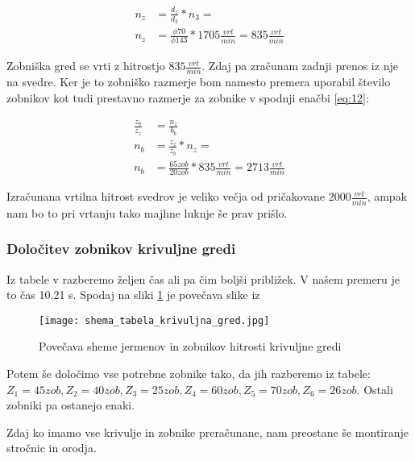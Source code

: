 \begin{equation}
    \label{eq:11}
    \begin{split}
        n_z &= \frac{d_z}{d_3} * n_3 = \\
        n_z &= \frac{\phi 70}{\phi 143} * 1705 \frac{vrt}{min} = 835 \frac{vrt}{min} 
    \end{split}
\end{equation}

Zobniška gred se vrti z hitrostjo \(835 \frac{vrt}{min}\). Zdaj pa zračunam 
zadnji prenos iz nje na svedre. Ker je to zobniško razmerje bom namesto 
premera uporabil število zobnikov kot tudi prestavno razmerje za zobnike
v spodnji enačbi \ref{eq:12}:

\begin{equation}
    \label{eq:12}
    \begin{split}
        \frac{z_b}{z_z} &= \frac{n_z}{b_b} \\
        n_b &= \frac{z_z}{z_b} * n_z = \\
        n_b &= \frac{65 zob}{20 zob} * 835 \frac{vrt}{min} = 2713 \frac{vrt}{min}
    \end{split}
\end{equation}

Izračunana vrtilna hitrost svedrov je veliko večja od pričakovane \(2000\frac{vrt}{min}\),
ampak nam bo to pri vrtanju tako majhne luknje še prav prišlo.

\newpage

\subsubsection{Določitev zobnikov krivuljne gredi}

    Iz tabele v  razberemo željen čas
    ali pa čim boljši približek. V našem premeru je to čas 10.21 s.
    Spodaj na sliki \ref{povecava} je povečava slike iz 
    \begin{figure}[H]
        \begin{center}
            \texttt{[image: shema\_tabela\_krivuljna\_gred.jpg]}
            \caption{Povečava sheme jermenov in zobnikov
            hitrosti krivuljne gredi
            \cite{gauthier}}
            \label{povecava}
        \end{center}
    \end{figure}

    Potem še določimo vse potrebne zobnike tako, da jih razberemo iz tabele: \\
    \(Z_1 = 45 zob, Z_2 = 40 zob, Z_3 = 25 zob, Z_4 = 60 zob, Z_5 = 70 zob, Z_6 = 26 zob\).
    Ostali zobniki pa ostanejo enaki.

    Zdaj ko imamo vse krivulje in zobnike preračunane, nam preostane še montiranje stročnic in orodja.